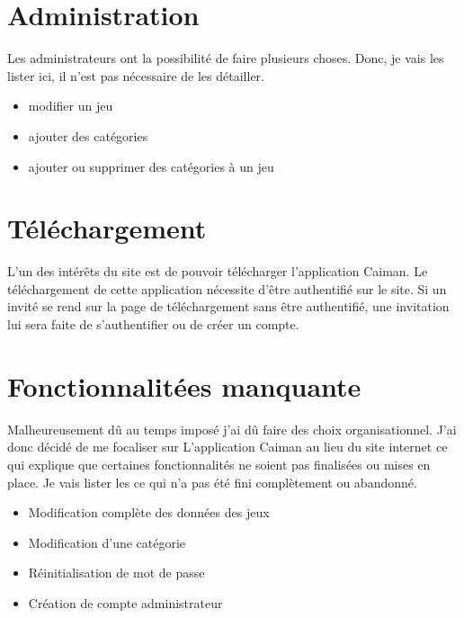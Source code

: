 \documentclass[a4paper,12pt,french]{sphinxmanual}
\begin{document}
\section{Administration}
\label{\detokenize{fonctionnelleWeb:administration}}
\sphinxAtStartPar
Les administrateurs ont la possibilité de faire plusieurs choses. Donc, je vais les lister ici, il n’est pas nécessaire de les détailler.
\begin{itemize}
\item {} 
\sphinxAtStartPar
modifier un jeu

\item {} 
\sphinxAtStartPar
ajouter des catégories

\item {} 
\sphinxAtStartPar
ajouter ou supprimer des catégories à un jeu

\end{itemize}






\section{Téléchargement}
\label{\detokenize{fonctionnelleWeb:telechargement}}
\sphinxAtStartPar
L’un des intérêts du site est de pouvoir télécharger l’application Caiman. Le téléchargement de cette application nécessite d’être authentifié sur le site. Si un invité se rend sur la page de téléchargement sans être authentifié, une invitation lui sera faite de s’authentifier ou de créer un compte.










\section{Fonctionnalitées manquante}
\label{\detokenize{fonctionnelleWeb:fonctionnalitees-manquante}}
\sphinxAtStartPar
Malheureusement dû au temps imposé j’ai dû faire des choix organisationnel. J’ai donc décidé de me focaliser sur L’application Caiman au lieu du site internet ce qui explique que certaines fonctionnalités ne soient pas finalisées ou mises en place. Je vais lister les ce qui n’a pas été fini complètement ou abandonné.
\begin{itemize}
\item {} 
\sphinxAtStartPar
Modification complète des données des jeux

\item {} 
\sphinxAtStartPar
Modification d’une catégorie

\item {} 
\sphinxAtStartPar
Réinitialisation de mot de passe

\item {} 
\sphinxAtStartPar
Création de compte administrateur

\end{itemize}
\end{document}
